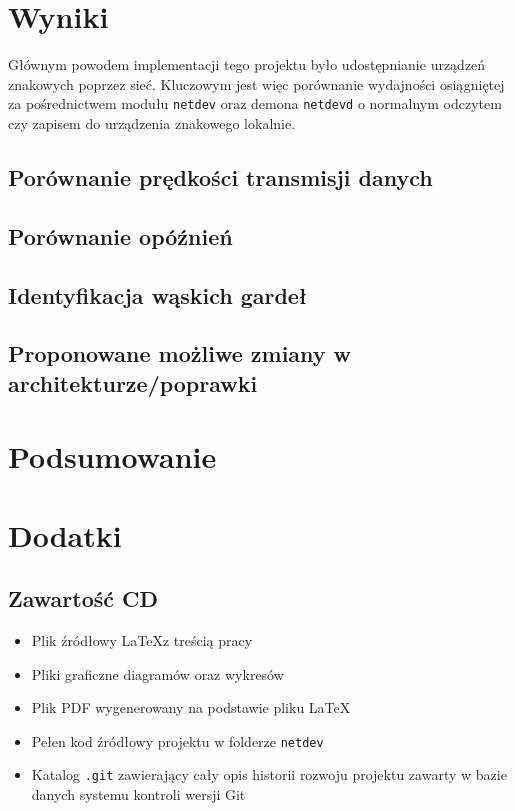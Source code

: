 \documentclass[10pt]{article}
\begin{document}
\section{Wyniki}

Głównym powodem implementacji tego projektu było udostępnianie urządzeń znakowych poprzez sieć. Kluczowym jest więc porównanie wydajności osiągniętej za pośrednictwem modułu \texttt{netdev} oraz demona \texttt{netdevd} o normalnym odczytem czy zapisem do urządzenia znakowego lokalnie.

\subsection{Porównanie prędkości transmisji danych}

\subsection{Porównanie opóźnień}

\subsection{Identyfikacja wąskich gardeł}

\subsection{Proponowane możliwe zmiany w architekturze/poprawki}

\section{Podsumowanie}
\section{Dodatki}

\subsection{Zawartość CD}

\begin{itemize}
\itemsep1pt\parskip0pt
\item
  Plik źródłowy \LaTeX z treścią pracy
\item
  Pliki graficzne diagramów oraz wykresów
\item
  Plik PDF wygenerowany na podstawie pliku LaTeX
\item
  Pełen kod źródłowy projektu w folderze \texttt{netdev}
\item
  Katalog \texttt{.git} zawierający cały opis historii rozwoju projektu
  zawarty w bazie danych systemu kontroli wersji Git
\end{itemize}
\end{document}
